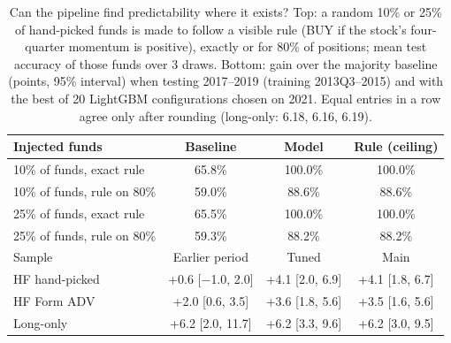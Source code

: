 \begin{table}[t]
  \caption{Can the pipeline find predictability where it exists? Top: a random 10\% or 25\% of
  hand-picked funds is made to follow a visible rule (BUY if the stock's four-quarter momentum is
  positive), exactly or for 80\% of positions; mean test accuracy of those funds over 3 draws. Bottom:
  gain over the majority baseline (points, 95\% interval) when testing 2017--2019 (training
  2013Q3--2015) and with the best of 20 LightGBM configurations chosen on 2021. Equal entries in a row
  agree only after rounding (long-only: 6.18, 6.16, 6.19).}
  \label{tab:controls}
  \footnotesize
  \setlength{\tabcolsep}{3pt}
  \begin{tabular}{@{}lccc@{}}
    \toprule
    Injected funds & Baseline & Model & Rule (ceiling) \\
    \midrule
    10\% of funds, exact rule & 65.8\% & 100.0\% & 100.0\% \\
    10\% of funds, rule on 80\% & 59.0\% & 88.6\% & 88.6\% \\
    25\% of funds, exact rule & 65.5\% & 100.0\% & 100.0\% \\
    25\% of funds, rule on 80\% & 59.3\% & 88.2\% & 88.2\% \\
    \midrule
    Sample & Earlier period & Tuned & Main \\
    \midrule
    HF hand-picked & +0.6 [\ensuremath{-}1.0, 2.0] & +4.1 [2.0, 6.9] & +4.1 [1.8, 6.7] \\
    HF Form ADV & +2.0 [0.6, 3.5] & +3.6 [1.8, 5.6] & +3.5 [1.6, 5.6] \\
    Long-only & +6.2 [2.0, 11.7] & +6.2 [3.3, 9.6] & +6.2 [3.0, 9.5] \\
    \bottomrule
  \end{tabular}
\end{table}
